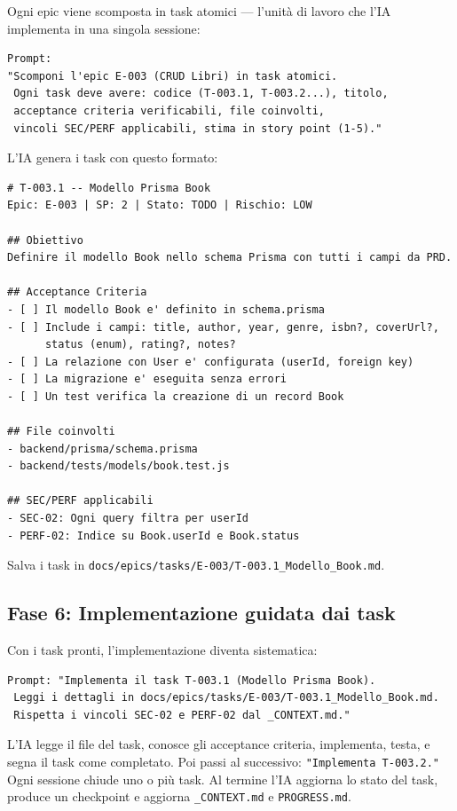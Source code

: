 Ogni epic viene scomposta in task atomici --- l'unità di lavoro che l'IA implementa in una singola sessione:

\begin{lstlisting}[language={}]
Prompt:
"Scomponi l'epic E-003 (CRUD Libri) in task atomici.
 Ogni task deve avere: codice (T-003.1, T-003.2...), titolo,
 acceptance criteria verificabili, file coinvolti,
 vincoli SEC/PERF applicabili, stima in story point (1-5)."
\end{lstlisting}

L'IA genera i task con questo formato:

\begin{lstlisting}[language={}]
# T-003.1 -- Modello Prisma Book
Epic: E-003 | SP: 2 | Stato: TODO | Rischio: LOW

## Obiettivo
Definire il modello Book nello schema Prisma con tutti i campi da PRD.

## Acceptance Criteria
- [ ] Il modello Book e' definito in schema.prisma
- [ ] Include i campi: title, author, year, genre, isbn?, coverUrl?,
      status (enum), rating?, notes?
- [ ] La relazione con User e' configurata (userId, foreign key)
- [ ] La migrazione e' eseguita senza errori
- [ ] Un test verifica la creazione di un record Book

## File coinvolti
- backend/prisma/schema.prisma
- backend/tests/models/book.test.js

## SEC/PERF applicabili
- SEC-02: Ogni query filtra per userId
- PERF-02: Indice su Book.userId e Book.status
\end{lstlisting}

Salva i task in \texttt{docs/epics/tasks/E-003/T-003.1\_Modello\_Book.md}.

\subsection{Fase 6: Implementazione guidata dai task}

Con i task pronti, l'implementazione diventa sistematica:

\begin{lstlisting}[language={}]
Prompt: "Implementa il task T-003.1 (Modello Prisma Book).
 Leggi i dettagli in docs/epics/tasks/E-003/T-003.1_Modello_Book.md.
 Rispetta i vincoli SEC-02 e PERF-02 dal _CONTEXT.md."
\end{lstlisting}

L'IA legge il file del task, conosce gli acceptance criteria, implementa, testa, e segna il task come completato. Poi passi al successivo: \texttt{"Implementa T-003.2."} Ogni sessione chiude uno o più task. Al termine l'IA aggiorna lo stato del task, produce un checkpoint e aggiorna \texttt{\_CONTEXT.md} e \texttt{PROGRESS.md}.

